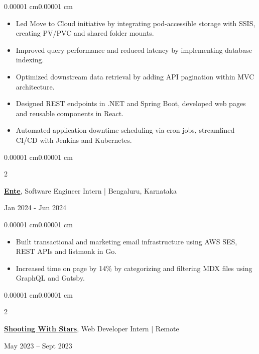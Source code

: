 \documentclass[10pt, letterpaper]{article}
\newenvironment{highlights}{
    \begin{itemize}[
        topsep=0.10 cm,
        parsep=0.10 cm,
        partopsep=0pt,
        itemsep=0pt,
        leftmargin=10pt
    ]
}{
    \end{itemize}
}
\newenvironment{onecolentry}{
    \begin{adjustwidth}{0.00001 cm}{0.00001 cm}
}{
    \end{adjustwidth}
}
\newenvironment{twocolentry}[2][]{
    \onecolentry
    \def\secondColumn{#2}
    \setcolumnwidth{\fill, 4.5 cm}
    \begin{paracol}{2}
}{
    \switchcolumn \raggedleft \secondColumn
    \end{paracol}
    \endonecolentry
}
\begin{document}
\vspace{0.10 cm}

\begin{onecolentry}
\begin{highlights}
    \item Led Move to Cloud initiative by integrating pod-accessible storage with SSIS, creating PV/PVC and shared folder mounts.
    \item Improved query performance and reduced latency by implementing database indexing.
    \item Optimized downstream data retrieval by adding API pagination within MVC architecture.
    \item Designed REST endpoints in .NET and Spring Boot, developed web pages and reusable components in React.
    \item Automated application downtime scheduling via cron jobs, streamlined CI/CD with Jenkins and Kubernetes.
\end{highlights}
\end{onecolentry}

\vspace{0.2 cm}

\begin{twocolentry}{Jan 2024 - Jun 2024}
\href{https://ente.io/}{\textbf{Ente}}, Software Engineer Intern | Bengaluru, Karnataka
\end{twocolentry}

\vspace{0.10 cm}

\begin{onecolentry}
\begin{highlights}
    \item Built transactional and marketing email infrastructure using AWS SES, REST APIs and listmonk in Go.
    \item Increased time on page by 14\% by categorizing and filtering MDX files using GraphQL and Gatsby.
\end{highlights}
\end{onecolentry}

\vspace{0.2 cm}

\begin{twocolentry}{May 2023 – Sept 2023}
\href{https://shootingwithstars.com/}{\textbf{Shooting With Stars}}, Web Developer Intern | Remote
\end{twocolentry}

\vspace{0.10 cm}
\end{document}
